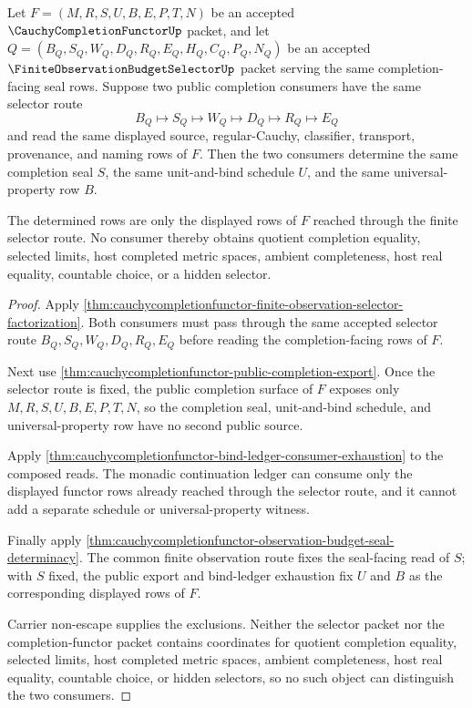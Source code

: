 \begin{theorem}
\label{thm:cauchycompletionfunctor-selector-budget-determinacy}
Let $F=(M,R,S,U,B,E,P,T,N)$ be an accepted $\CauchyCompletionFunctorUp$ packet, and let $Q=(B_Q,S_Q,W_Q,D_Q,R_Q,E_Q,H_Q,C_Q,P_Q,N_Q)$ be an accepted $\FiniteObservationBudgetSelectorUp$ packet serving the same completion-facing seal rows. Suppose two public completion consumers have the same selector route
$$
B_Q \longmapsto S_Q \longmapsto W_Q \longmapsto D_Q \longmapsto R_Q \longmapsto E_Q
$$
and read the same displayed source, regular-Cauchy, classifier, transport, provenance, and naming rows of $F$. Then the two consumers determine the same completion seal $S$, the same unit-and-bind schedule $U$, and the same universal-property row $B$.

The determined rows are only the displayed rows of $F$ reached through the finite selector route. No consumer thereby obtains quotient completion equality, selected limits, host completed metric spaces, ambient completeness, host real equality, countable choice, or a hidden selector.
\end{theorem}
\begin{proof}
Apply \autoref{thm:cauchycompletionfunctor-finite-observation-selector-factorization}. Both consumers must pass through the same accepted selector route $B_Q,S_Q,W_Q,D_Q,R_Q,E_Q$ before reading the completion-facing rows of $F$.

Next use \autoref{thm:cauchycompletionfunctor-public-completion-export}. Once the selector route is fixed, the public completion surface of $F$ exposes only $M,R,S,U,B,E,P,T,N$, so the completion seal, unit-and-bind schedule, and universal-property row have no second public source.

Apply \autoref{thm:cauchycompletionfunctor-bind-ledger-consumer-exhaustion} to the composed reads. The monadic continuation ledger can consume only the displayed functor rows already reached through the selector route, and it cannot add a separate schedule or universal-property witness.

Finally apply \autoref{thm:cauchycompletionfunctor-observation-budget-seal-determinacy}. The common finite observation route fixes the seal-facing read of $S$; with $S$ fixed, the public export and bind-ledger exhaustion fix $U$ and $B$ as the corresponding displayed rows of $F$.

Carrier non-escape supplies the exclusions. Neither the selector packet nor the completion-functor packet contains coordinates for quotient completion equality, selected limits, host completed metric spaces, ambient completeness, host real equality, countable choice, or hidden selectors, so no such object can distinguish the two consumers.
\end{proof}


